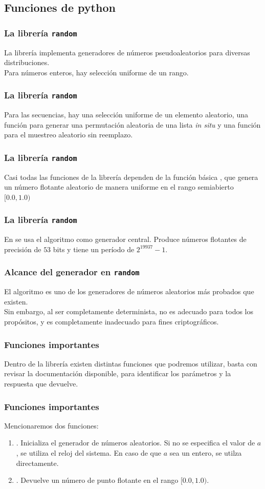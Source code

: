 \documentclass[12pt]{beamer}
\begin{document}
\subsection{Funciones de python}

\begin{frame}
\frametitle{La librería \texttt{random}}
La librería  implementa generadores de números pseudoaleatorios para diversas distribuciones.
\\
\bigskip
\pause
Para números enteros, hay selección uniforme de un rango.
\end{frame}
\begin{frame}
\frametitle{La librería \texttt{random}}
Para las secuencias, hay una selección uniforme de un elemento aleatorio, una función para generar una permutación aleatoria de una lista \emph{in situ} y una función para el muestreo aleatorio sin reemplazo.
\end{frame}
\begin{frame}
\frametitle{La librería \texttt{random}}
Casi todas las funciones de la librería dependen de la función básica , que genera un número flotante aleatorio de manera uniforme en el rango semiabierto $[0.0, 1.0)$
\end{frame}
\begin{frame}
\frametitle{La librería \texttt{random}}
En \python{} se usa el algoritmo  como generador central. Produce números flotantes de precisión de $53$ bits y tiene un período de $2^{19937}-1$.
\end{frame}
\begin{frame}
\frametitle{Alcance del generador en \texttt{random}}
El algoritmo  es uno de los generadores de números aleatorios más probados que existen.
\\
\bigskip
\pause
Sin embargo, al ser completamente determinista, no es adecuado para todos los propósitos, y es completamente inadecuado para fines criptográficos.
\end{frame}
\begin{frame}
\frametitle{Funciones importantes}
Dentro de la librería  existen distintas funciones que podremos utilizar, basta con revisar la documentación disponible, para identificar los parámetros y la respuesta que devuelve.
\end{frame}
\begin{frame}
\frametitle{Funciones importantes}
Mencionaremos dos funciones:
\pause
{}
\begin{enumerate}[<+->]
\item {}. Inicializa el generador de números aleatorios. Si no se especifica el valor de $a$, se utiliza el reloj del sistema. En caso de que $a$ sea un entero, se utilza directamente.
\item {}. Devuelve un número de punto flotante en el rango $[0.0, 1.0)$.
\end{enumerate}
\end{frame}
\end{document}
